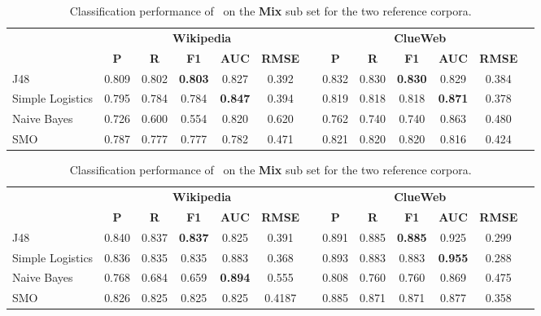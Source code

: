 \begin{table}
\footnotesize
\setlength{\tabcolsep}{1.5pt}
\caption{Classification performance of \DeFacto\ on the \textbf{Mix} sub set for the two reference corpora.}
\label{table:Defacto_Mix}
\begin{tabular*}{\textwidth}{lcccccccccccc}
    \toprule
    &\multicolumn{5}{c}{\textbf{Wikipedia }} & & \multicolumn{5}{c}{\textbf{ClueWeb}}\\
    &\textbf{P}&\textbf{R}&\textbf{F1}&\textbf{AUC}&\textbf{RMSE}&&\textbf{P}&\textbf{R}&\textbf{F1}&\textbf{AUC}&\textbf{RMSE}\\
    \midrule
    J48 & 0.809 & 0.802 & \textbf{0.803} & 0.827 & 0.392 && 0.832 & 0.830 & \textbf{0.830} & 0.829 & 0.384\\
    Simple Logistics & 0.795 & 0.784 & 0.784 & \textbf{0.847} & 0.394 && 0.819 & 0.818 & 0.818 & \textbf{0.871} & 0.378\\
    Naive Bayes & 0.726 & 0.600 & 0.554 & 0.820 & 0.620 && 0.762 & 0.740 & 0.740 & 0.863 & 0.480\\
    SMO & 0.787 & 0.777 & 0.777 & 0.782 & 0.471 && 0.821 & 0.820 & 0.820 & 0.816 & 0.424\\
    \bottomrule
\end{tabular*}
\end{table}

\begin{table}
\footnotesize
\setlength{\tabcolsep}{1.5pt}
\caption{Classification performance of \FactCheck\ on the \textbf{Mix} sub set for the two reference corpora.}
\label{table:FactCheck_Mix}
\begin{tabular*}{\textwidth}{lcccccccccccc}
    \toprule
    &\multicolumn{5}{c}{\textbf{Wikipedia }} & & \multicolumn{5}{c}{\textbf{ClueWeb}}\\
    &\textbf{P}&\textbf{R}&\textbf{F1}&\textbf{AUC}&\textbf{RMSE}&&\textbf{P}&\textbf{R}&\textbf{F1}&\textbf{AUC}&\textbf{RMSE}\\
    \midrule
    J48 & 0.840 & 0.837 & \textbf{0.837} & 0.825 & 0.391 && 0.891 & 0.885 & \textbf{0.885} & 0.925 & 0.299\\
    Simple Logistics & 0.836 & 0.835 & 0.835 & 0.883 & 0.368 && 0.893 & 0.883 & 0.883 & \textbf{0.955} & 0.288\\
    Naive Bayes & 0.768 & 0.684 & 0.659 & \textbf{0.894} & 0.555 && 0.808 & 0.760 & 0.760 & 0.869 & 0.475\\
    SMO & 0.826 & 0.825 & 0.825 & 0.825 & 0.4187 && 0.885 & 0.871 & 0.871 & 0.877 & 0.358\\
    \bottomrule
\end{tabular*}
\end{table}

